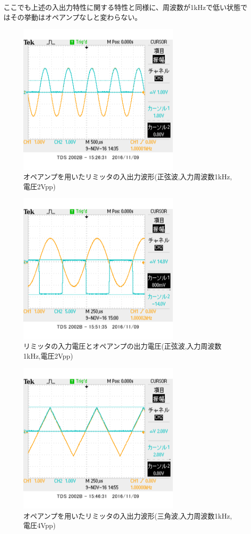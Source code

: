\documentclass[11pt,a4j]{jsarticle}
\begin{document}
    ここでも上述の入出力特性に関する特性と同様に、周波数が1kHzで低い状態ではその挙動はオペアンプなしと変わらない。
    
    \begin{figure}[htbp]
  \centering
  \includegraphics[width=8cm,clip]{1_1_ampFG_f1V2_ViVo.png}
  \caption{オペアンプを用いたリミッタの入出力波形(正弦波,入力周波数1kHz,電圧2Vpp)}
  \label{fig:ampFGf1v2vivo}
 \end{figure}%
 
 \begin{figure}[htbp]
  \centering
  \includegraphics[width=8cm,clip]{1_1_ampFG_f1V2_ViVa.png}
  \caption{リミッタの入力電圧とオペアンプの出力電圧(正弦波,入力周波数1kHz,電圧2Vpp)}
  \label{fig:ampFGf1v2viva}
 \end{figure}%
 
 \begin{figure}[htbp]
  \centering
  \includegraphics[width=8cm,clip]{1_1_ampFG_f1V4sankaku_ViVo.png}
  \caption{オペアンプを用いたリミッタの入出力波形(三角波,入力周波数1kHz,電圧4Vpp)}
  \label{fig:ampFGf1v4vivo}
 \end{figure}%
 
\end{document}
